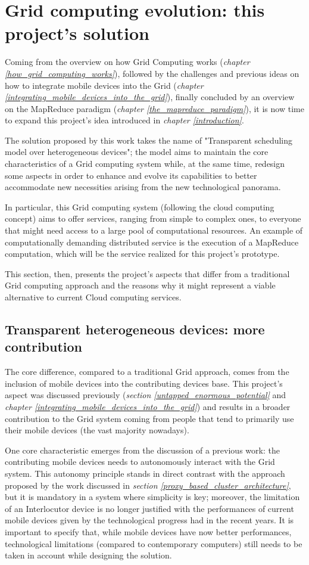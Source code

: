 \section{Grid computing evolution: this project's solution}
Coming from the overview on how Grid Computing works (\textit{chapter \ref{how_grid_computing_works}}), followed by the challenges and previous ideas on how to integrate mobile devices into the Grid (\textit{chapter \ref{integrating_mobile_devices_into_the_grid}}), finally concluded by an overview on the MapReduce paradigm (\textit{chapter \ref{the_mapreduce_paradigm}}), it is now time to expand this project's idea introduced in \textit{chapter \ref{introduction}}.

The solution proposed by this work takes the name of "Transparent scheduling model over heterogeneous devices"; the model aims to maintain the core characteristics of a Grid computing system while, at the same time, redesign some aspects in order to enhance and evolve its capabilities to better accommodate new necessities arising from the new technological panorama.

In particular, this Grid computing system (following the cloud computing concept) aims to offer services, ranging from simple to complex ones, to everyone that might need access to a large pool of computational resources. An example of computationally demanding distributed service is the execution of a MapReduce computation, which will be the service realized for this project's prototype.

This section, then, presents the project's aspects that differ from a traditional Grid computing approach and the reasons why it might represent a viable alternative to current Cloud computing services.

\subsection{Transparent heterogeneous devices: more contribution}
The core difference, compared to a traditional Grid approach, comes from the inclusion of mobile devices into the contributing devices base.
This project's aspect was discussed previously (\textit{section \ref{untapped_enormous_potential}} and \textit{chapter \ref{integrating_mobile_devices_into_the_grid}}) and results in a broader contribution to the Grid system coming from people that tend to primarily use their mobile devices (the vast majority nowadays).

One core characteristic emerges from the discussion of a previous work: the contributing mobile devices needs to autonomously interact with the Grid system.
This autonomy principle stands in direct contrast with the approach proposed by the work discussed in \textit{section \ref{proxy_based_cluster_architecture}}, but it is mandatory in a system where simplicity is key; moreover, the limitation of an Interlocutor device is no longer justified with the performances of current mobile devices given by the technological progress had in the recent years. It is important to specify that, while mobile devices have now better performances, technological limitations (compared to contemporary computers) still needs to be taken in account while designing the solution.

